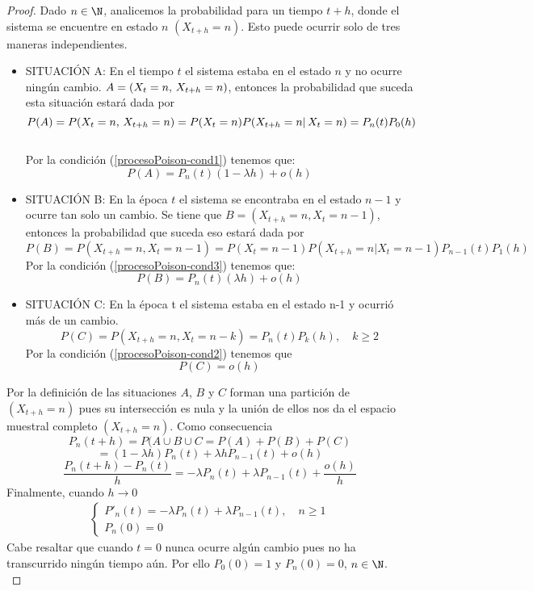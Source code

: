     \begin{proof}
        Dado $n\in\N$, analicemos la probabilidad para un tiempo $t+h$, donde el sistema se encuentre en estado $n$ $(X_{t+h}=n)$. Esto puede ocurrir solo de tres maneras independientes.
        \begin{itemize}
            \item SITUACIÓN A: En el tiempo $t$ el sistema estaba en el estado $n$ y no ocurre ningún cambio. $A=(X_t=n,\thinspace X_{t+h}=n)$, entonces la probabilidad que suceda esta situación estará dada por $$P(A)=P(X_t=n,\thinspace X_{t+h}=n)=P(X_t=n)P(X_{t+h}=n|\thinspace X_{t}=n)=P_n(t)P_0(h)$$\\
            Por la condición (\ref{procesoPoison-cond1})
            tenemos que:
            $$P(A)=P_n(t)(1-\lambda h)+o(h)$$
            \item SITUACIÓN B: En la época $t$ el sistema se encontraba en el estado $n-1$ y ocurre tan solo un cambio. Se tiene que $B=(X_{t+h}=n, X_t=n-1)$, entonces la  probabilidad que suceda eso estará dada por
            $$P(B)=P(X_{t+h}=n, X_t=n-1)=P(X_t=n-1)P(X_{t+h}=n|X_t=n-1)P_{n-1}(t)P_1(h)$$
             Por la condición (\ref{procesoPoison-cond3})
            tenemos que:
            $$P(B)=P_n(t)(\lambda h)+o(h)$$
            \item SITUACIÓN C: En la época t el sistema estaba en el estado n-1 y ocurrió más de un cambio.
            $$P(C)=P(X_{t+h}=n, X_t=n-k)=P_n(t)P_k(h), \quad k\geq 2$$
             Por la condición (\ref{procesoPoison-cond2})
            tenemos que
            $$P(C)=o(h)$$
        \end{itemize}
        Por la definición de las situaciones $A$, $B$ y $C$ forman una partición de $(X_{t+h}=n)$ pues su intersección es nula y la unión de ellos nos da el espacio muestral completo $(X_{t+h}=n)$. Como consecuencia 
        $$P_n(t+h)=P(A\cup B\cup C=P(A)+P(B)+P(C)$$ $$=(1-\lambda h)P_n(t)+\lambda h P_{n-1}(t)+o(h)$$
        $$\frac{P_n(t+h)-P_n(t)}{h}=-\lambda P_n(t)+\lambda P_{n-1}(t)+\frac{o(h)}{h}$$
        Finalmente, cuando $h\rightarrow 0$
        \begin{eqnarray}
            \begin{cases}
                P'_n(t)=-\lambda P_n(t)+\lambda P_{n-1}(t),\quad n\geq 1\\
                P_n(0)=0
            \end{cases}
            \label{ProcPoison-edo-n}
        \end{eqnarray}
        Cabe resaltar que cuando $t=0$ nunca ocurre algún cambio pues no ha transcurrido ningún tiempo aún. Por ello $P_0(0)=1$ y $P_n(0)=0$, $n\in\N$. \\

\end{proof}
